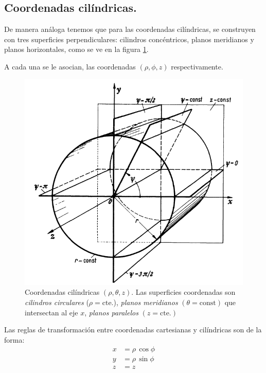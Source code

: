\subsection{Coordenadas cilíndricas.}

De manera análoga tenemos que para las coordenadas cilíndricas, se construyen con tres superficies perpendiculares: cilindros concéntricos, planos meridianos y planos horizontales, como se ve en la figura \ref{fig:figura_planos_cilindricos}.
\par
A cada una se le asocian, las coordenadas $(\rho, \phi, z)$ respectivamente.
\begin{figure}[H]
   \centering
   \includegraphics[scale=1.5]{Imagenes/Planos_Coordenadas_Cilindricas.png}
   \caption{Coordenadas cilíndricas $(\rho, \theta, z)$. Las superficies coordenadas son \emph{cilindros circulares} ($\rho = \mbox{cte.}$), \emph{planos meridianos} $(\theta = \mbox{const})$ que intersectan al eje $x$, \emph{planos paralelos} $(z = \mbox{cte.})$}
   \label{fig:figura_planos_cilindricos}
\end{figure}
Las reglas de transformación entre coordenadas cartesianas y cilíndricas son de la forma:
\begin{align*}
x &= \rho \, \cos \phi \\ 
y &= \rho \, \sin \phi \\
z &= z
\end{align*}

